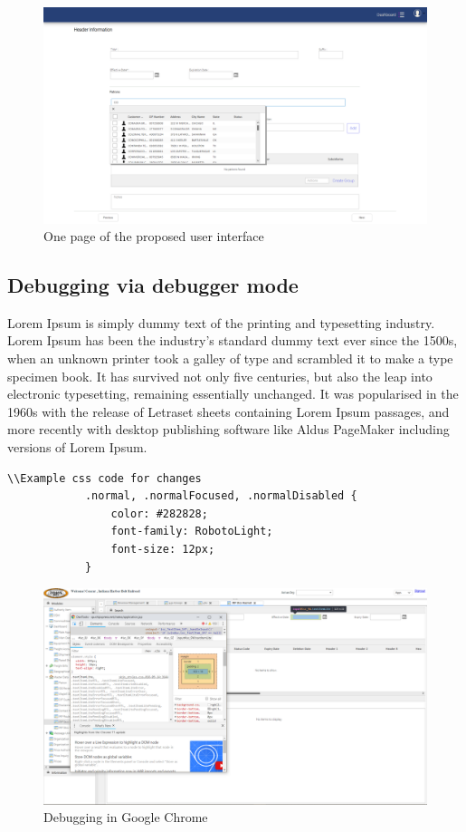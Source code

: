 \documentclass[12pt,a4paper]{report}
\begin{document}
\begin{figure}[H]
\centering
\includegraphics[scale=.35]{NewUI.png}
  \caption{One page of the proposed user interface}
  \label{fig:NewUI}
\end{figure}

\subsection{Debugging via debugger mode}
Lorem Ipsum is simply dummy text of the printing and typesetting industry. Lorem Ipsum has been the industry's standard dummy text ever since the 1500s, when an unknown printer took a galley of type and scrambled it to make a type specimen book. It has survived not only five centuries, but also the leap into electronic typesetting, remaining essentially unchanged. It was popularised in the 1960s with the release of Letraset sheets containing Lorem Ipsum passages, and more recently with desktop publishing software like Aldus PageMaker including versions of Lorem Ipsum.
 
\begin{lstlisting}
\\Example css code for changes
			.normal, .normalFocused, .normalDisabled {
			    color: #282828;
			    font-family: RobotoLight;
			    font-size: 12px;
			}
\end{lstlisting}


\begin{figure}[H]
\centering
\includegraphics[scale=.4]{Debugging.png}
  \caption{Debugging in Google Chrome}
  \label{fig:Debugging}
\end{figure}
\end{document}
